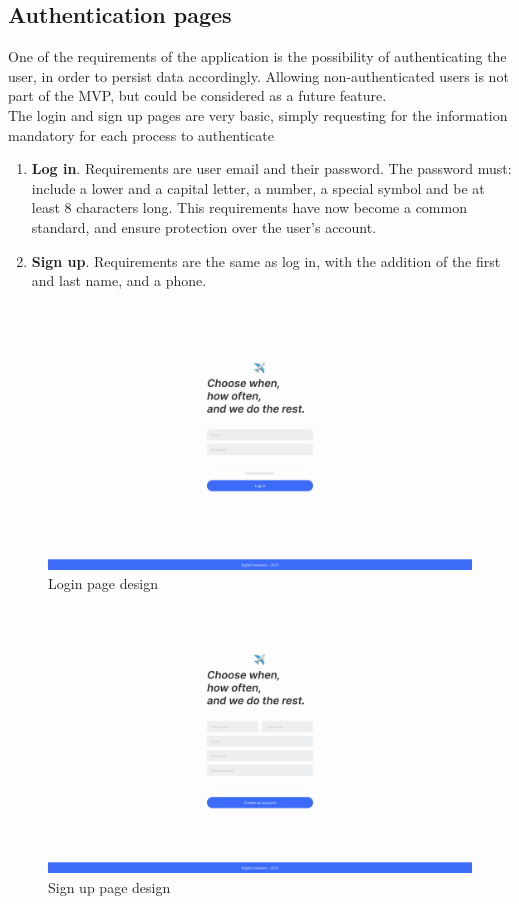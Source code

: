 \documentclass[./memory.tex]{subfiles}
\begin{document}
\subsection{Authentication pages}
One of the requirements of the application is the possibility of authenticating
the user, in order to persist data accordingly. Allowing non-authenticated users
is not part of the MVP, but could be considered as a future feature.
\\[8pt]
The login and sign up pages are very basic, simply requesting for the
information mandatory for each process to authenticate
\begin{enumerate}[label = -]
	\item\textbf{Log in}. Requirements are user email and their password. The
	password must: include a lower and a capital letter, a number, a special
	symbol and be at least 8 characters long. This requirements have now
	become a common standard, and ensure protection over the user's account.
	\item\textbf{Sign up}. Requirements are the same as log in, with the addition
	of the first and last name, and a phone.
\end{enumerate}
\begin{figure}[H]
	\centering
	\includegraphics[width=\textwidth]{./assets/designs/login-desktop.png}
	\caption{Login page design}
\end{figure}
\begin{figure}[H]
	\centering
	\includegraphics[width=\textwidth]{./assets/designs/signup-desktop.png}
	\caption{Sign up page design}
\end{figure}
\newpage
\end{document}
